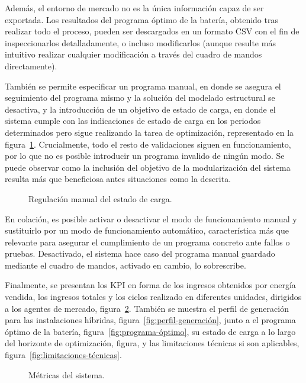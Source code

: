 Además, el entorno de mercado no es la única información capaz de ser exportada. Los resultados del programa óptimo de la batería, obtenido tras realizar todo el proceso, pueden ser descargados en un formato CSV con el fin de inspeccionarlos detalladamente, o incluso modificarlos (aunque resulte más intuitivo realizar cualquier modificación a través del cuadro de mandos directamente).

También se permite especificar un programa manual, en donde se asegura el seguimiento del programa mismo y la solución del modelado estructural se desactiva, y la introducción de un objetivo de estado de carga, en donde el sistema cumple con las indicaciones de estado de carga en los periodos determinados pero sigue realizando la tarea de optimización, representado en la figura~\ref{fig:soc-manual}. Crucialmente, todo el resto de validaciones siguen en funcionamiento, por lo que no es posible introducir un programa invalido de ningún modo. Se puede observar como la inclusión del objetivo de la modularización del sistema resulta más que beneficiosa antes situaciones como la descrita.

\begin{figure}
  \centering
  \caption{Regulación manual del estado de carga.}
  \label{fig:soc-manual}
\end{figure}

En colación, es posible activar o desactivar el modo de funcionamiento manual y sustituirlo por un modo de funcionamiento automático, característica más que relevante para asegurar el cumplimiento de un programa concreto ante fallos o pruebas. Desactivado, el sistema hace caso del programa manual guardado mediante el cuadro de mandos, activado en cambio, lo sobrescribe.

Finalmente, se presentan los KPI en forma de los ingresos obtenidos por energía vendida, los ingresos totales y los ciclos realizado en diferentes unidades, dirigidos a los agentes de mercado, figura~\ref{fig:kpi-sistema}. También se muestra el perfil de generación para las instalaciones híbridas, figura~\ref{fig:perfil-generación}, junto a el programa óptimo de la batería, figura~\ref{fig:programa-óptimo}, su estado de carga a lo largo del horizonte de optimización, figura, y las limitaciones técnicas si son aplicables, figura~\ref{fig:limitaciones-técnicas}.

\begin{figure}
  \centering
  \caption{Métricas del sistema.}
  \label{fig:kpi-sistema}
\end{figure}

